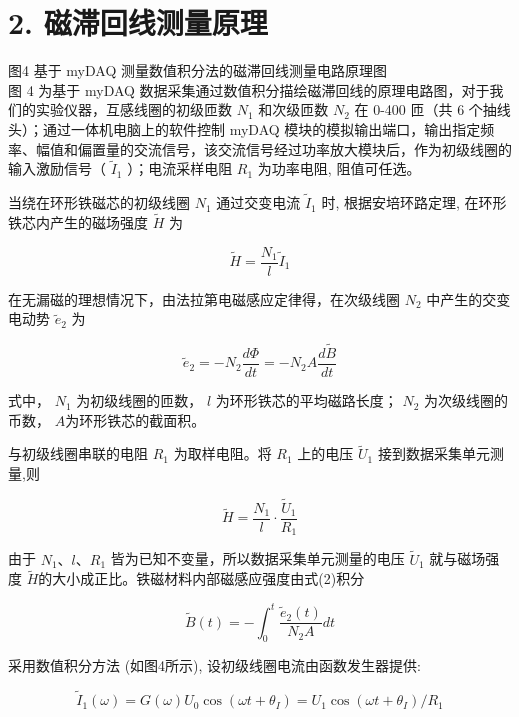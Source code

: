 \documentclass[dvipsnames, svgnames,a4paper,11pt]{article}
\begin{document}
\section*{2. 磁滞回线测量原理}


图4 基于 myDAQ 测量数值积分法的磁滞回线测量电路原理图\\
图 4 为基于 myDAQ 数据采集通过数值积分描绘磁滞回线的原理电路图，对于我们的实验仪器，互感线圈的初级匝数 $N_{1}$ 和次级匝数 $N_{2}$ 在 0-400 匝（共 6 个抽线头）；通过一体机电脑上的软件控制 myDAQ 模块的模拟输出端口，输出指定频率、幅值和偏置量的交流信号，该交流信号经过功率放大模块后，作为初级线圈的输入激励信号（ $\tilde{I}_{1}$ ）；电流采样电阻 $R_{1}$ 为功率电阻, 阻值可任选。

当绕在环形铁磁芯的初级线圈 $N_{1}$ 通过交变电流 $\tilde{I}_{1}$ 时, 根据安培环路定理, 在环形铁芯内产生的磁场强度 $\widetilde{H}$ 为


\begin{equation*}
\widetilde{H}=\frac{N_{1}}{l} \tilde{I}_{1} \tag{1}
\end{equation*}


在无漏磁的理想情况下，由法拉第电磁感应定律得，在次级线圈 $N_{2}$ 中产生的交变电动势 $\tilde{e}_{2}$ 为


\begin{equation*}
\tilde{e}_{2}=-N_{2} \frac{d \Phi}{d t}=-N_{2} A \frac{d \tilde{B}}{d t} \tag{2}
\end{equation*}


式中， $N_{1}$ 为初级线圈的匝数， $l$ 为环形铁芯的平均磁路长度； $N_{2}$ 为次级线圈的币数， $A$为环形铁芯的截面积。

与初级线圈串联的电阻 $R_{1}$ 为取样电阻。将 $R_{1}$ 上的电压 $\widetilde{U}_{1}$ 接到数据采集单元测量,则


\begin{equation*}
\widetilde{H}=\frac{N_{1}}{l} \cdot \frac{\widetilde{U}_{1}}{R_{1}} \tag{3}
\end{equation*}


由于 $N_{1} 、 l 、 R_{1}$ 皆为已知不变量，所以数据采集单元测量的电压 $\widetilde{U}_{1}$ 就与磁场强度 $\widetilde{H}$的大小成正比。铁磁材料内部磁感应强度由式(2)积分


\begin{equation*}
\tilde{B}(t)=-\int_{0}^{t} \frac{\tilde{e}_{2}(t)}{N_{2} A} d t \tag{4}
\end{equation*}


采用数值积分方法 (如图4所示), 设初级线圈电流由函数发生器提供:


\begin{equation*}
\tilde{I}_{1}(\omega)=G(\omega) U_{0} \cos \left(\omega t+\theta_{I}\right)=U_{1} \cos \left(\omega t+\theta_{I}\right) / R_{1} \tag{5}
\end{equation*}
\end{document}
